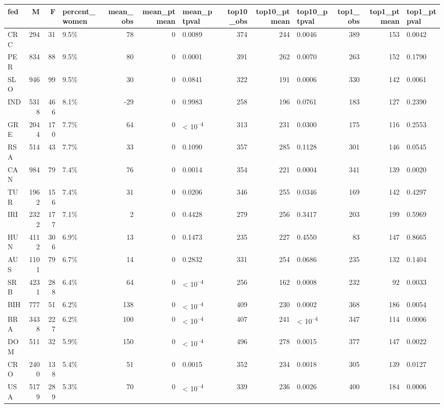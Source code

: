 
\begin{tabular}{l|r|r|l|r|r|l|r|r|l|r|r|l}
\hline
fed & M & F & percent_women & mean_obs & mean_ptmean & mean_ptpval & top10_obs & top10_ptmean & top10_ptpval & top1_obs & top1_ptmean & top1_ptpval\\
\hline
CRC & 294 & 31 & 9.5\% & 78 & 0 & 0.0089 & 374 & 244 & 0.0046 & 389 & 153 & 0.0042\\
\hline
PER & 834 & 88 & 9.5\% & 80 & 0 & 0.0001 & 391 & 262 & 0.0070 & 263 & 152 & 0.1790\\
\hline
SLO & 946 & 99 & 9.5\% & 30 & 0 & 0.0841 & 322 & 191 & 0.0006 & 330 & 142 & 0.0061\\
\hline
IND & 5318 & 466 & 8.1\% & -29 & 0 & 0.9983 & 258 & 196 & 0.0761 & 183 & 127 & 0.2390\\
\hline
GRE & 2044 & 170 & 7.7\% & 64 & 0 & < 10\textsuperscript{--4} & 313 & 231 & 0.0300 & 175 & 116 & 0.2553\\
\hline
RSA & 514 & 43 & 7.7\% & 33 & 0 & 0.1090 & 357 & 285 & 0.1128 & 301 & 146 & 0.0545\\
\hline
CAN & 984 & 79 & 7.4\% & 76 & 0 & 0.0014 & 354 & 221 & 0.0004 & 341 & 139 & 0.0020\\
\hline
TUR & 1962 & 156 & 7.4\% & 31 & 0 & 0.0206 & 346 & 255 & 0.0346 & 169 & 142 & 0.4297\\
\hline
IRI & 2322 & 177 & 7.1\% & 2 & 0 & 0.4428 & 279 & 256 & 0.3417 & 203 & 199 & 0.5969\\
\hline
HUN & 4112 & 306 & 6.9\% & 13 & 0 & 0.1473 & 235 & 227 & 0.4550 & 83 & 147 & 0.8665\\
\hline
AUS & 1101 & 79 & 6.7\% & 14 & 0 & 0.2832 & 331 & 254 & 0.0686 & 235 & 132 & 0.1404\\
\hline
SRB & 4231 & 288 & 6.4\% & 64 & 0 & < 10\textsuperscript{--4} & 256 & 162 & 0.0008 & 232 & 92 & 0.0033\\
\hline
BIH & 777 & 51 & 6.2\% & 138 & 0 & < 10\textsuperscript{--4} & 409 & 230 & 0.0002 & 368 & 186 & 0.0054\\
\hline
BRA & 3438 & 227 & 6.2\% & 100 & 0 & < 10\textsuperscript{--4} & 407 & 241 & < 10\textsuperscript{--4} & 347 & 114 & 0.0006\\
\hline
DOM & 511 & 32 & 5.9\% & 150 & 0 & < 10\textsuperscript{--4} & 496 & 278 & 0.0015 & 377 & 147 & 0.0022\\
\hline
CRO & 2400 & 138 & 5.4\% & 51 & 0 & 0.0015 & 352 & 234 & 0.0018 & 305 & 139 & 0.0127\\
\hline
USA & 5179 & 289 & 5.3\% & 70 & 0 & < 10\textsuperscript{--4} & 339 & 236 & 0.0026 & 400 & 184 & 0.0006\\

\end{tabular}
